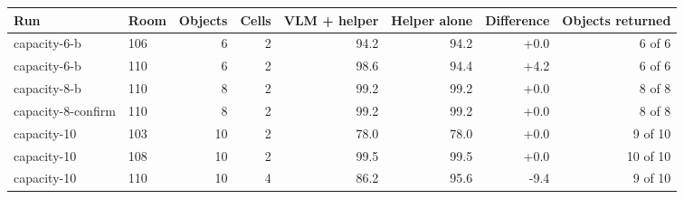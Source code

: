 \begin{tabular}{@{}llrrrrrr@{}}
\toprule
Run & Room & Objects & Cells & VLM + helper & Helper alone & Difference & Objects returned \\
\midrule
capacity-6-b & 106 & 6 & 2 & 94.2 & 94.2 & +0.0 & 6 of 6 \\
capacity-6-b & 110 & 6 & 2 & 98.6 & 94.4 & +4.2 & 6 of 6 \\
capacity-8-b & 110 & 8 & 2 & 99.2 & 99.2 & +0.0 & 8 of 8 \\
capacity-8-confirm & 110 & 8 & 2 & 99.2 & 99.2 & +0.0 & 8 of 8 \\
capacity-10 & 103 & 10 & 2 & 78.0 & 78.0 & +0.0 & 9 of 10 \\
capacity-10 & 108 & 10 & 2 & 99.5 & 99.5 & +0.0 & 10 of 10 \\
capacity-10 & 110 & 10 & 4 & 86.2 & 95.6 & -9.4 & 9 of 10 \\
\bottomrule
\end{tabular}
